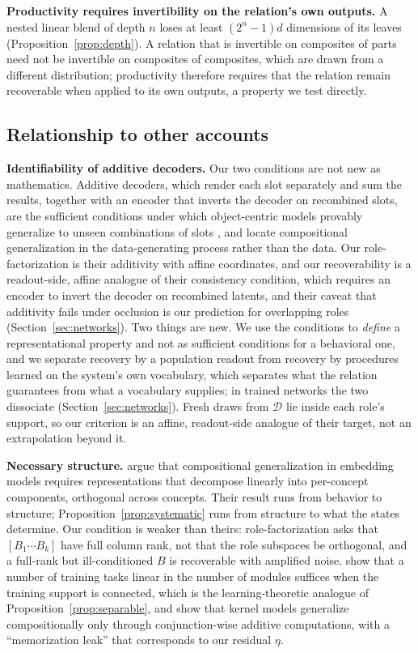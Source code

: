 \documentclass[10pt]{article}
\theoremstyle{plain}
\theoremstyle{remark}
\newcommand{\D}{\mathcal{D}}
\begin{document}
\textbf{Productivity requires invertibility on the relation's own outputs.} A nested linear blend of depth $n$ loses at least $(2^n - 1)d$ dimensions of its leaves (Proposition~\ref{prop:depth}). A relation that is invertible on composites of parts need not be invertible on composites of composites, which are drawn from a different distribution; productivity therefore requires that the relation remain recoverable when applied to its own outputs, a property we test directly.

\subsection{Relationship to other accounts}
\label{sec:related}

\textbf{Identifiability of additive decoders.} Our two conditions are not new as mathematics. Additive decoders, which render each slot separately and sum the results, together with an encoder that inverts the decoder on recombined slots, are the sufficient conditions under which object-centric models provably generalize to unseen combinations of slots \citep{brady2023,lachapelle2023,wiedemer2024}, and \citet{wiedemer2023} locate compositional generalization in the data-generating process rather than the data. Our role-factorization is their additivity with affine coordinates, and our recoverability is a readout-side, affine analogue of their consistency condition, which requires an encoder to invert the decoder on recombined latents, and their caveat that additivity fails under occlusion is our prediction for overlapping roles (Section~\ref{sec:networks}). Two things are new. We use the conditions to \emph{define} a representational property and not as sufficient conditions for a behavioral one, and we separate recovery by a population readout from recovery by procedures learned on the system's own vocabulary, which separates what the relation guarantees from what a vocabulary supplies; in trained networks the two dissociate (Section~\ref{sec:networks}). Fresh draws from $\D$ lie inside each role's support, so our criterion is an affine, readout-side analogue of their target, not an extrapolation beyond it.

\textbf{Necessary structure.} \citet{uselis2026} argue that compositional generalization in embedding models requires representations that decompose linearly into per-concept components, orthogonal across concepts. Their result runs from behavior to structure; Proposition~\ref{prop:systematic} runs from structure to what the states determine. Our condition is weaker than theirs: role-factorization asks that $[B_1 \cdots B_k]$ have full column rank, not that the role subspaces be orthogonal, and a full-rank but ill-conditioned $B$ is recoverable with amplified noise. \citet{schug2024} show that a number of training tasks linear in the number of modules suffices when the training support is connected, which is the learning-theoretic analogue of Proposition~\ref{prop:separable}, and \citet{lippl2025} show that kernel models generalize compositionally only through conjunction-wise additive computations, with a ``memorization leak'' that corresponds to our residual $\eta$.
\end{document}
